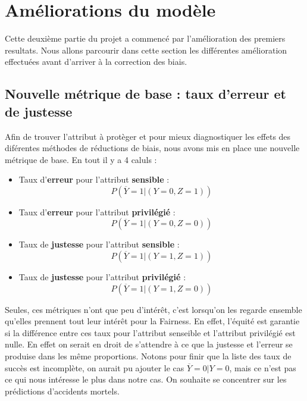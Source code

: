 \documentclass{article}
\begin{document}
    \section{Améliorations du modèle}
    Cette deuxième partie du projet a commencé par l'amélioration des premiers resultats. Nous allons parcourir 
    dans cette section les différentes amélioration effectuées avant d'arriver à la correction des biais.

    \subsection{Nouvelle métrique de base : taux d'erreur et de justesse}

    Afin de trouver l'attribut à protèger et pour mieux diagnostiquer les effets des diférentes méthodes de réductions de
    biais, nous avons mis en place une nouvelle métrique de base. En tout il y a 4 caluls : 

    \begin{itemize}
        \item Taux d'\textbf{erreur} pour l'attribut \textbf{sensible} : \[ P(\overline{Y}=1| (Y=0, Z=1)) \]
        \item Taux d'\textbf{erreur} pour l'attribut \textbf{privilégié} : \[ P(\overline{Y}=1| (Y=0, Z=0)) \]
        \item Taux de \textbf{justesse} pour l'attribut \textbf{sensible} : \[ P(\overline{Y}=1| (Y=1, Z=1)) \]
        \item Taux de \textbf{justesse} pour l'attribut \textbf{privilégié} : \[ P(\overline{Y}=1| (Y=1, Z=0)) \]
    \end{itemize}

    Seules, ces métriques n'ont que peu d'intérêt, c'est lorsqu'on les regarde ensemble qu'elles prennent tout leur intérêt pour 
    la Fairness. En effet, l'équité est garantie si la différence entre ces taux pour l'attribut senseible et l'attribut privilégié 
    est nulle. En effet on serait en droit de s'attendre à ce que la justesse et l'erreur se produise dans les même proportions. 
    Notons pour finir que la liste des taux de succès est incomplète, on aurait pu ajouter le cas $\overline{Y}=0| Y=0$, mais ce n'est pas ce qui 
    nous intéresse le plus dans notre cas. On souhaite se concentrer sur les prédictions d'accidents mortels.
\end{document}
